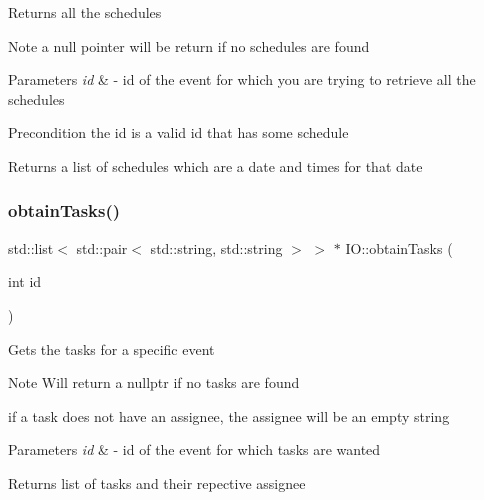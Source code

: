Returns all the schedules \begin{DoxyNote}{Note}
a null pointer will be return if no schedules are found 
\end{DoxyNote}

\begin{DoxyParams}{Parameters}
{\em id} & -\/ id of the event for which you are trying to retrieve all the schedules \\
\hline
\end{DoxyParams}
\begin{DoxyPrecond}{Precondition}
the id is a valid id that has some schedule 
\end{DoxyPrecond}
\begin{DoxyReturn}{Returns}
a list of schedules which are a date and times for that date 
\end{DoxyReturn}
\mbox{\label{classIO_af2c5dffa84ae0741d41b0a3ccf5990ae}} 
\subsubsection{\texorpdfstring{obtain\+Tasks()}{obtainTasks()}}
{\footnotesize\ttfamily std\+::list$<$ std\+::pair$<$ std\+::string, std\+::string $>$ $>$ $\ast$ I\+O\+::obtain\+Tasks (\begin{DoxyParamCaption}\item[{int}]{id }\end{DoxyParamCaption})}

Gets the tasks for a specific event \begin{DoxyNote}{Note}
Will return a nullptr if no tasks are found 

if a task does not have an assignee, the assignee will be an empty string 
\end{DoxyNote}

\begin{DoxyParams}{Parameters}
{\em id} & -\/ id of the event for which tasks are wanted \\
\hline
\end{DoxyParams}
\begin{DoxyReturn}{Returns}
list of tasks and their repective assignee 
\end{DoxyReturn}
\mbox{\label{classIO_a3829dc8ad91e1f2d560be799b6d9b04d}} 

